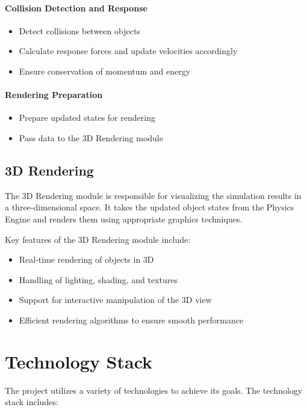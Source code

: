 \paragraph{Collision Detection and Response}
\begin{itemize}
    \item Detect collisions between objects
    \item Calculate response forces and update velocities accordingly
    \item Ensure conservation of momentum and energy
\end{itemize}

\paragraph{Rendering Preparation}
\begin{itemize}
    \item Prepare updated states for rendering
    \item Pass data to the 3D Rendering module
\end{itemize}

\subsection{3D Rendering}

The 3D Rendering module is responsible for visualizing the simulation results in a three-dimensional space. It takes the updated object states from the Physics Engine and renders them using appropriate graphics techniques.

Key features of the 3D Rendering module include:
\begin{itemize}
    \item Real-time rendering of objects in 3D
    \item Handling of lighting, shading, and textures
    \item Support for interactive manipulation of the 3D view
    \item Efficient rendering algorithms to ensure smooth performance
\end{itemize}

\section{Technology Stack}

The project utilizes a variety of technologies to achieve its goals. The technology stack includes:


